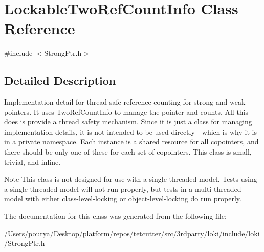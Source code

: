 \hypertarget{classLockableTwoRefCountInfo}{}\section{Lockable\+Two\+Ref\+Count\+Info Class Reference}
\label{classLockableTwoRefCountInfo}


{\ttfamily \#include $<$Strong\+Ptr.\+h$>$}



\subsection{Detailed Description}
Implementation detail for thread-\/safe reference counting for strong and weak pointers. It uses Two\+Ref\+Count\+Info to manage the pointer and counts. All this does is provide a thread safety mechanism. Since it is just a class for managing implementation details, it is not intended to be used directly -\/ which is why it is in a private namespace. Each instance is a shared resource for all copointers, and there should be only one of these for each set of copointers. This class is small, trivial, and inline.

\begin{DoxyNote}{Note}
This class is not designed for use with a single-\/threaded model. Tests using a single-\/threaded model will not run properly, but tests in a multi-\/threaded model with either class-\/level-\/locking or object-\/level-\/locking do run properly. 
\end{DoxyNote}


The documentation for this class was generated from the following file\+:\begin{DoxyCompactItemize}
\item 
/\+Users/pourya/\+Desktop/platform/repos/tetcutter/src/3rdparty/loki/include/loki/Strong\+Ptr.\+h\end{DoxyCompactItemize}

